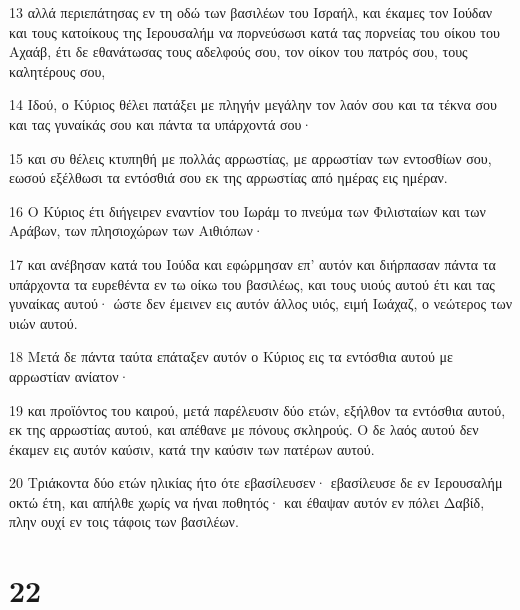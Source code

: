 \par 13 αλλά περιεπάτησας εν τη οδώ των βασιλέων του Ισραήλ, και έκαμες τον Ιούδαν και τους κατοίκους της Ιερουσαλήμ να πορνεύσωσι κατά τας πορνείας του οίκου του Αχαάβ, έτι δε εθανάτωσας τους αδελφούς σου, τον οίκον του πατρός σου, τους καλητέρους σου,
\par 14 Ιδού, ο Κύριος θέλει πατάξει με πληγήν μεγάλην τον λαόν σου και τα τέκνα σου και τας γυναίκάς σου και πάντα τα υπάρχοντά σου·
\par 15 και συ θέλεις κτυπηθή με πολλάς αρρωστίας, με αρρωστίαν των εντοσθίων σου, εωσού εξέλθωσι τα εντόσθιά σου εκ της αρρωστίας από ημέρας εις ημέραν.
\par 16 Ο Κύριος έτι διήγειρεν εναντίον του Ιωράμ το πνεύμα των Φιλισταίων και των Αράβων, των πλησιοχώρων των Αιθιόπων·
\par 17 και ανέβησαν κατά του Ιούδα και εφώρμησαν επ' αυτόν και διήρπασαν πάντα τα υπάρχοντα τα ευρεθέντα εν τω οίκω του βασιλέως, και τους υιούς αυτού έτι και τας γυναίκας αυτού· ώστε δεν έμεινεν εις αυτόν άλλος υιός, ειμή Ιωάχαζ, ο νεώτερος των υιών αυτού.
\par 18 Μετά δε πάντα ταύτα επάταξεν αυτόν ο Κύριος εις τα εντόσθια αυτού με αρρωστίαν ανίατον·
\par 19 και προϊόντος του καιρού, μετά παρέλευσιν δύο ετών, εξήλθον τα εντόσθια αυτού, εκ της αρρωστίας αυτού, και απέθανε με πόνους σκληρούς. Ο δε λαός αυτού δεν έκαμεν εις αυτόν καύσιν, κατά την καύσιν των πατέρων αυτού.
\par 20 Τριάκοντα δύο ετών ηλικίας ήτο ότε εβασίλευσεν· εβασίλευσε δε εν Ιερουσαλήμ οκτώ έτη, και απήλθε χωρίς να ήναι ποθητός· και έθαψαν αυτόν εν πόλει Δαβίδ, πλην ουχί εν τοις τάφοις των βασιλέων.

\chapter{22}

